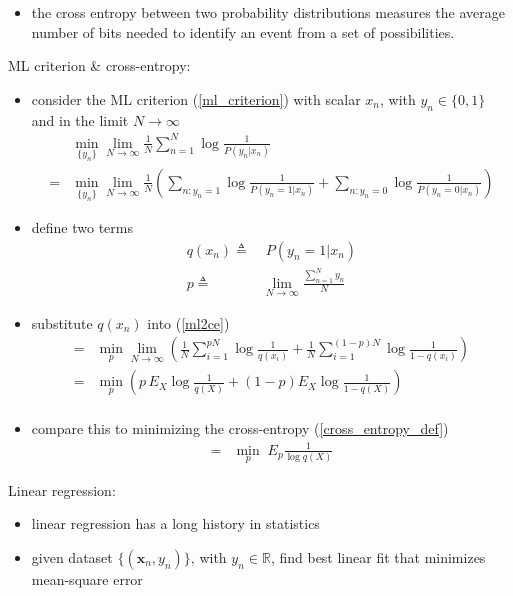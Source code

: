 \documentclass[onecolumn]{IEEEtran}
\newcommand{\beq}{\begin{equation}}
\newcommand{\eeq}{\end{equation}}
\newcommand{\bi}{\begin{itemize}}
\newcommand{\ei}{\end{itemize}}
\begin{document}
\begin{itemize}
        \item the cross entropy between two probability distributions measures the average number of bits needed to identify an event from a set of possibilities.
    \ei
     \item ML criterion \& cross-entropy:
    \bi
        \item consider the ML criterion (\ref{ml_criterion})  with scalar $x_n$, with $y_n \in \{0, 1\}$ and in the limit $N \rightarrow \infty$
        \beq\label{ml2ce}\begin{split}
        &\min_{\{y_n\}} \lim_{N \rightarrow \infty} \frac{1}{N}\sum_{n=1}^{N}\log \frac{1}{P(y_n|x_n)} \\
              =&\min_{\{y_n\}}  \lim_{N \rightarrow \infty} \frac{1}{N}\left(\sum_{n:y_n=1}\log \frac{1}{P(y_n = 1|x_n)} + \sum_{n:y_n=0}\log \frac{1}{P(y_n = 0|x_n)}\right)
        \end{split}\eeq
        \item define two terms
        \beq\label{p}\begin{split}
            q(x_n) \triangleq & \; P(y_n = 1|x_n)\\
            p \triangleq & \lim_{N \rightarrow \infty} \frac{\sum_{n=1}^N y_n}{N}
        \end{split}\eeq
        \item substitute $q(x_n)$ into (\ref{ml2ce})
        \beq\begin{split}
              =& \min_{p} \lim_{N \rightarrow \infty} \left(\frac{1}{N}\sum_{i=1}^{pN}\log \frac{1}{q(x_i)} + \frac{1}{N}\sum_{i=1}^{(1-p)N}\log \frac{1}{1-q(x_i)}\right)\\
              =& \min_{p} \left(p \, E_X \log \frac{1}{q(X)} +  (1-p)E_X \log\frac{1}{1-q(X)}\right)\\
        \end{split}\eeq
        \item compare this to minimizing the cross-entropy (\ref{cross_entropy_def})
        \beq\begin{split}\label{cross_entropy_der}
              = &  \min_{p} \;  E_p \frac{1}{\log q(X)}
        \end{split}\eeq
    \ei
    \item Linear regression:
    \bi
        \item linear regression has a long history in statistics
        \item given dataset $\{(\bm{x}_n,y_n)\}$, with $y_n \in \mathbb{R}$, find best linear fit that minimizes mean-square error

\end{itemize}
\end{document}
